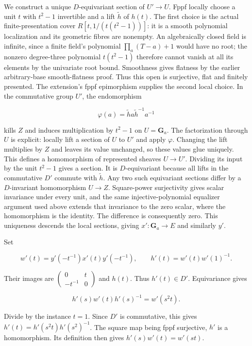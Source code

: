 \documentclass[11pt,a4paper,openany]{report}
\newcounter{none}
\begin{document}
We construct a unique \(D\)-equivariant section of \(U'\to U\). Fppf locally choose a unit \(t\) with \(t^2-1\) invertible and a lift \(\tilde h\) of \(h(t)\). The first choice is the actual finite-presentation cover \(R[t,1/(t(t^2-1))]\): it is a smooth polynomial localization and its geometric fibres are nonempty. An algebraically closed field is infinite, since a finite field's polynomial \(\prod_a(T-a)+1\) would have no root; the nonzero degree-three polynomial \(t(t^2-1)\) therefore cannot vanish at all its elements by the univariate root bound. Smoothness gives flatness by the earlier arbitrary-base smooth-flatness proof. Thus this open is surjective, flat and finitely presented. The extension's fppf epimorphism supplies the second local choice. In the commutative group \(U'\), the endomorphism

\[
\varphi(a)=\tilde h a\tilde h^{-1}a^{-1}
\]

kills \(Z\) and induces multiplication by \(t^2-1\) on \(U=\mathbf G_a\). The factorization through \(U\) is explicit: locally lift a section of \(U\) to \(U'\) and apply \(\varphi\). Changing the lift multiplies by \(Z\) and leaves its value unchanged, so these values glue uniquely. This defines a homomorphism of represented sheaves \(U\to U'\). Dividing its input by the unit \(t^2-1\) gives a section. It is \(D\)-equivariant because all lifts in the commutative \(D'\) commute with \(\tilde h\). Any two such equivariant sections differ by a \(D\)-invariant homomorphism \(U\to Z\). Square-power surjectivity gives scalar invariance under every unit, and the same injective-polynomial equalizer argument used above extends that invariance to the zero scalar, where the homomorphism is the identity. The difference is consequently zero. This uniqueness descends the local sections, giving \(x':\mathbf G_a\to E\) and similarly \(y'\).

Set

\[
w'(t)=y'(-t^{-1})x'(t)y'(-t^{-1}),\qquad
h'(t)=w'(t)w'(1)^{-1}.
\]

Their images are \(\begin{pmatrix}0&t\\-t^{-1}&0\end{pmatrix}\) and \(h(t)\). Thus \(h'(t)\in D'\). Equivariance gives

\[
h'(s)w'(t)h'(s)^{-1}=w'(s^2t).
\]

Divide by the instance \(t=1\). Since \(D'\) is commutative, this gives \(h'(t)=h'(s^2t)h'(s^2)^{-1}\). The square map being fppf surjective, \(h'\) is a homomorphism. Its definition then gives \(h'(s)w'(t)=w'(st)\).
\end{document}
